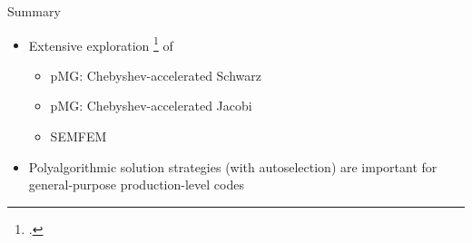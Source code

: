 \begin{frame}{Summary}
  \begin{itemize}
    \item Extensive exploration \footcite{phillips-tuning-2022} of
    \begin{itemize}
      \item pMG: Chebyshev-accelerated Schwarz
      \item pMG: Chebyshev-accelerated Jacobi
      \item SEMFEM
    \end{itemize}
  \end{itemize}
    \vspace{-0.25cm}
    
  \begin{itemize}
    \vspace{-0.5cm}
    \item Polyalgorithmic solution strategies (with autoselection)
        are important for general-purpose production-level codes
  \end{itemize}
\end{frame}